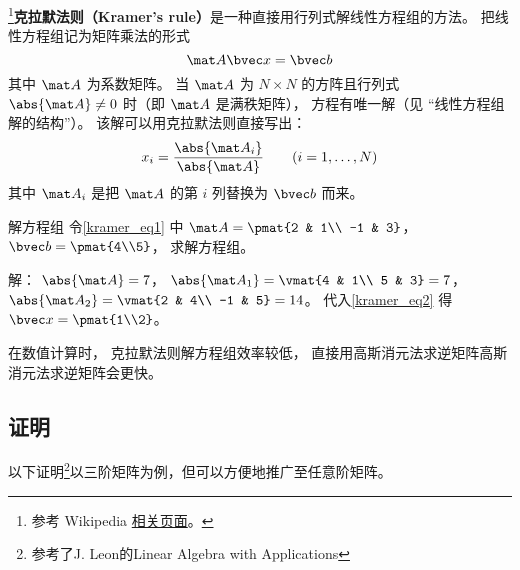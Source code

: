 
\begin{issues}
\issueTODO
\end{issues}


\footnote{参考 Wikipedia \href{https://en.wikipedia.org/wiki/Cramer's_rule}{相关页面}。}\textbf{克拉默法则（Kramer's rule）}是一种直接用行列式解线性方程组的方法。 把线性方程组记为矩阵乘法的形式
\begin{equation}\label{kramer_eq1}
\mat A \bvec x = \bvec b
\end{equation}
其中 $\mat A$ 为系数矩阵。 当 $\mat A$ 为 $N\times N$ 的方阵且行列式 $\abs{\mat A} \ne 0$ 时（即 $\mat A$ 是满秩矩阵）， 方程有唯一解（见 “线性方程组解的结构”）。 该解可以用克拉默法则直接写出：
\begin{equation}\label{kramer_eq2}
x_i = \frac{\abs{\mat A_i}}{\abs{\mat A}} \qquad (i = 1, \dots, N)
\end{equation}
其中 $\mat A_i$ 是把 $\mat A$ 的第 $i$ 列替换为 $\bvec b$ 而来。

\begin{example}{解方程组}
令\autoref{kramer_eq1} 中 $\mat A = \pmat{2 & 1\\ -1 & 3}$， $\bvec b = \pmat{4\\5}$， 求解方程组。

解： $\abs{\mat A} = 7$， $\abs{\mat A_1} = \vmat{4 & 1\\ 5 & 3} = 7$， $\abs{\mat A_2} = \vmat{2 & 4\\ -1 & 5} = 14$。 代入\autoref{kramer_eq2} 得 $\bvec x = \pmat{1\\2}$。
\end{example}

在数值计算时， 克拉默法则解方程组效率较低， 直接用高斯消元法求逆矩阵高斯消元法求逆矩阵会更快。

\subsection{证明}
以下证明\footnote{参考了J. Leon的Linear Algebra with Applications}以三阶矩阵为例，但可以方便地推广至任意阶矩阵。

